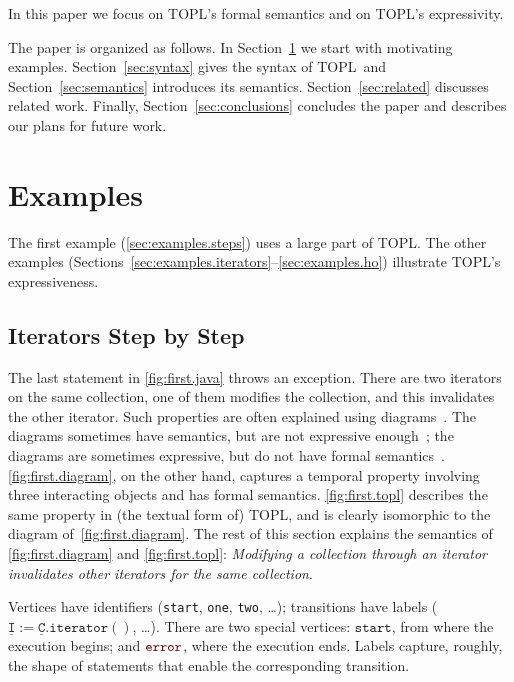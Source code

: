 \documentclass{sigplanconf} %
\newcommand{\TPL}{TOPL}
\newcommand{\error}{\ensuremath{\textcolor{darkred}{\mathtt{error}}}\xspace}
\newcommand{\pattern}[1]{\ensuremath{\mathtt{\underline{#1}}}}
\newcommand{\start}{\ensuremath{\mathtt{start}}\xspace}
\theoremstyle{definition}
\theoremstyle{remark}
\begin{document}
In this paper we focus on TOPL's formal semantics and on TOPL's expressivity.

The paper is organized as follows. In Section~\ref{sec:examples} we start with motivating examples.
Section~\ref{sec:syntax} gives the syntax of \TPL \ and Section~\ref{sec:semantics} introduces its semantics.
Section~\ref{sec:related} discusses related work.
Finally, Section~\ref{sec:conclusions} concludes the paper and describes our plans for future work.

\section{Examples} \label{sec:examples} %

The first example (\autoref{sec:examples.steps}) uses a large part of \TPL\null.
The other examples (Sections~\ref*{sec:examples.iterators}--\ref*{sec:examples.ho}) illustrate TOPL's expressiveness.

\subsection{Iterators Step by Step} \label{sec:examples.steps} %

The last statement in \autoref{fig:first.java} throws an exception.
There are two iterators on the same collection, one of them modifies the collection, and this invalidates the other iterator.
Such properties are often explained using diagrams~\cite{dblp:journals/scp/FieldGRY05,dblp:conf/issta/FinkYDRG06,dblp:conf/oopsla/bierhoffa07,dblp:conf/oopsla/naeeml08,dblp:conf/sigsoft/boddenlh08,dblp:conf/ecoop/bierhoffba09}.
The diagrams sometimes have semantics, but are not expressive enough~\cite{dblp:journals/scp/FieldGRY05,dblp:conf/issta/FinkYDRG06};
the diagrams are sometimes expressive, but do not have formal semantics~\cite{dblp:conf/oopsla/bierhoffa07,dblp:conf/oopsla/naeeml08,dblp:conf/sigsoft/boddenlh08,dblp:conf/ecoop/bierhoffba09}.
\autoref{fig:first.diagram}, on the other hand, captures a temporal property involving three interacting objects and has formal semantics.
\autoref{fig:first.topl} describes the same property in (the textual form of) TOPL, and is clearly isomorphic to the diagram of~\autoref{fig:first.diagram}.
The rest of this section explains the semantics of \autoref{fig:first.diagram} and \autoref{fig:first.topl}:
\emph{Modifying a collection through an iterator invalidates other iterators for the same collection}.

Vertices have identifiers (\texttt{start}, \texttt{one}, \texttt{two}, \dots);
transitions have labels ($\pattern I:=\pattern C.\mathtt{iterator}()$, \dots).
There are two special vertices: \start, from where the execution begins; and \error, where the execution ends.
Labels capture, roughly, the shape of statements that enable the corresponding transition.
\end{document}
